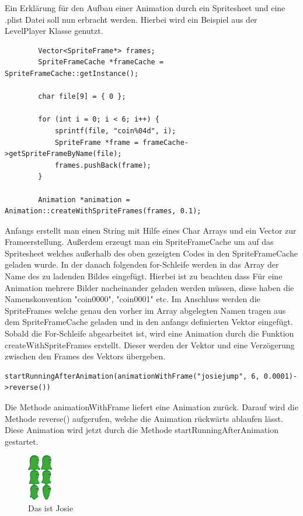 Ein Erklärung für den Aufbau einer Animation durch ein Spritesheet und eine .plist Datei soll nun erbracht werden. Hierbei wird ein Beispiel aus der LevelPlayer Klasse genutzt. 

\begin{lstlisting}
		Vector<SpriteFrame*> frames;
		SpriteFrameCache *frameCache = SpriteFrameCache::getInstance();

		char file[9] = { 0 };

		for (int i = 0; i < 6; i++) {
			sprintf(file, "coin%04d", i);
			SpriteFrame *frame = frameCache->getSpriteFrameByName(file);
			frames.pushBack(frame);
		}

		Animation *animation = Animation::createWithSpriteFrames(frames, 0.1);
\end{lstlisting}

Anfangs erstellt man einen String mit Hilfe eines Char Arrays und ein Vector zur Frameerstellung. Außerdem erzeugt man ein SpriteFrameCache um auf das Spritesheet welches außerhalb des oben gezeigten Codes in den SpriteFrameCache geladen wurde. In der danach folgenden for-Schleife werden
in das Array der Name des zu ladenden Bildes eingefügt. Hierbei ist zu beachten dass Für eine Animation mehrere Bilder nacheinander geladen werden müssen, diese haben die Namenskonvention "coin0000", "coin0001" etc. Im Anschluss werden die SpriteFrames welche genau den vorher im Array abgelegten Namen tragen aus dem SpriteFrameCache geladen und in den anfangs definierten Vektor eingefügt. 
Sobald die For-Schleife abgearbeitet ist, wird eine Animation durch die Funktion createWithSpriteFrames erstellt. Dieser werden der Vektor und eine Verzögerung zwischen den Frames des Vektors übergeben.

\begin{lstlisting}
startRunningAfterAnimation(animationWithFrame("josiejump", 6, 0.0001)->reverse())
\end{lstlisting}

Die Methode animationWithFrame liefert eine Animation zurück. Darauf wird die Methode reverse() aufgerufen, welche die Animation rückwärts ablaufen lässt. Diese Animation wird jetzt durch die Methode startRunningAfterAnimation gestartet. 

\begin{figure}[H]
  \includegraphics[width=0.1\textwidth]{resources/josiejump}
  \caption{Das ist Josie}
  \label{fig:josie} 
\end{figure}

